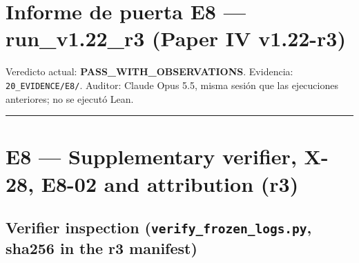 \documentclass[
]{article}
\author{}
\date{}
\begin{document}
\section{Informe de puerta E8 --- run\_v1.22\_r3 (Paper IV
v1.22-r3)}\label{informe-de-puerta-e8--run_v122_r3-paper-iv-v122-r3}

Veredicto actual: \textbf{PASS\_WITH\_OBSERVATIONS}. Evidencia:
\texttt{20\_EVIDENCE/E8/}. Auditor: Claude Opus 5.5, misma sesión que
las ejecuciones anteriores; no se ejecutó Lean.

\begin{center}\rule{0.5\linewidth}{0.5pt}\end{center}

\section{E8 --- Supplementary verifier, X-28, E8-02 and attribution
(r3)}\label{e8--supplementary-verifier-x-28-e8-02-and-attribution-r3}

\subsection{\texorpdfstring{Verifier inspection
(\texttt{verify\_frozen\_logs.py}, sha256 in the r3
manifest)}{Verifier inspection (verify\_frozen\_logs.py, sha256 in the r3 manifest)}}\label{verifier-inspection-verify_frozen_logspy-sha256-in-the-r3-manifest}
\end{document}
